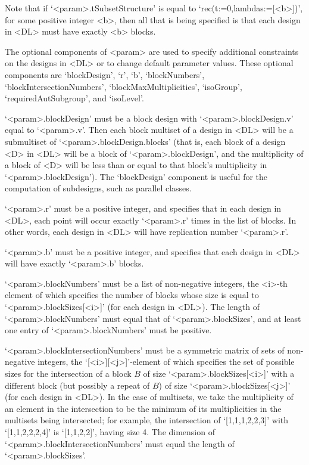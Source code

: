 Note that if `<param>.tSubsetStructure' is equal to
`rec(t:=0,lambdas:=[<b>])', for some positive integer <b>, then all
that is being specified is that each design in <DL> must have exactly
<b> blocks.

The optional components of <param> are used to specify additional
constraints on the designs in <DL> or to change default parameter
values. These optional components are `blockDesign', `r', `b',
`blockNumbers', `blockIntersectionNumbers', `blockMaxMultiplicities',
`isoGroup', `requiredAutSubgroup', and `isoLevel'.

`<param>.blockDesign' must  be a block design with `<param>.blockDesign.v'
equal to `<param>.v'. Then each block multiset of a design in <DL> will
be a submultiset of `<param>.blockDesign.blocks' (that is, each block of
a design <D> in <DL> will be a block of `<param>.blockDesign', and the
multiplicity of a block of <D> will be less than or equal to that block's
multiplicity in `<param>.blockDesign'). The `blockDesign' component is
useful for the computation of subdesigns, such as parallel classes.

`<param>.r' must be a positive integer, and specifies that in each design
in <DL>, each point will occur exactly `<param>.r' times in the list of
blocks. In other words, each design in <DL> will have replication number
`<param>.r'.

`<param>.b' must be a positive integer, and specifies that each design
in <DL> will have exactly `<param>.b' blocks.

`<param>.blockNumbers' must be a list of non-negative integers, the <i>-th
element of which specifies the number of blocks whose size is equal
to `<param>.blockSizes[<i>]' (for each design in <DL>). The length of
`<param>.blockNumbers' must equal that of `<param>.blockSizes', and at
least one entry of `<param>.blockNumbers' must be positive.

`<param>.blockIntersectionNumbers' must be a symmetric matrix of sets
of non-negative integers, the `[<i>][<j>]'-element of which specifies
the set of possible sizes for the intersection of a block $B$ of
size `<param>.blockSizes[<i>]' with a different block (but possibly
a repeat of $B$) of size `<param>.blockSizes[<j>]' (for each design
in <DL>). In the case of multisets, we take the multiplicity of an
element in the intersection to be the minimum of its multiplicities in
the multisets being intersected; for example, the intersection of
`[1,1,1,2,2,3]' with `[1,1,2,2,2,4]' is `[1,1,2,2]', having size 4. The
dimension of `<param>.blockIntersectionNumbers' must equal the length of
`<param>.blockSizes'.

